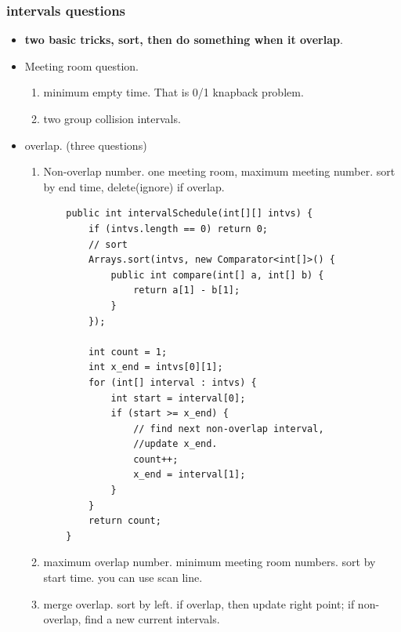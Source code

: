 \documentclass[a4paper,11pt,twoside]{book}
\begin{document}
\subsubsection{intervals questions}
\begin{itemize}
	\item \textbf{two basic tricks, sort, then do something when it overlap}.
	
	\item Meeting room question. 
	\begin{enumerate}
		\item minimum empty time. That is 0/1 knapback problem.
		\item two group collision intervals.
	\end{enumerate}
	

	\item overlap. (three questions)
\begin{enumerate}
	\item Non-overlap number. one meeting room, maximum meeting number. sort by end time, delete(ignore) if overlap. 
\begin{lstlisting}
	public int intervalSchedule(int[][] intvs) {
		if (intvs.length == 0) return 0;
		// sort
		Arrays.sort(intvs, new Comparator<int[]>() {
			public int compare(int[] a, int[] b) {
				return a[1] - b[1];
			}
		});
		
		int count = 1;
		int x_end = intvs[0][1];
		for (int[] interval : intvs) {
			int start = interval[0];
			if (start >= x_end) {
				// find next non-overlap interval, 
				//update x_end. 
				count++;
				x_end = interval[1];
			}
		}
		return count;
	}
\end{lstlisting}
	
	\item maximum overlap number. minimum meeting room numbers. sort by start time. you can use scan line. 
	
	\item merge overlap. sort by left. if overlap, then update right point; if non-overlap, find a new current intervals. 

\end{enumerate}
	

\end{itemize}
\end{document}
